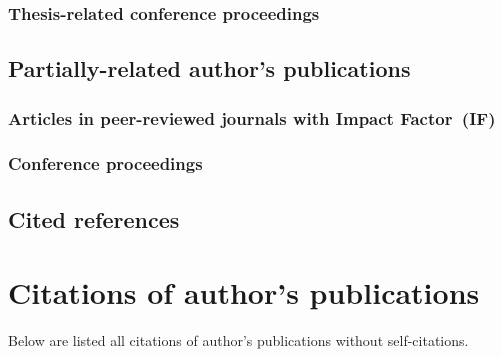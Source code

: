 \documentclass[a4paper,11pt,titlepage,twoside]{book}
\newcommand{\chapternoclear}[1]{
  \begingroup
  \let\cleardoublepage\clearpage
  \chapter{#1}
  \endgroup
}
\begin{document}

\subsection*{Thesis-related conference proceedings}
\printbibliography[keyword={mine},keyword={phd_related},keyword={conference},heading=none,title={}]

\section{Partially-related author's publications}

\subsection*{Articles in peer-reviewed journals with Impact Factor~(IF)}
\printbibliography[keyword={mine},keyword={phd_unrelated},keyword={journal},keyword={if},heading=none,title={}]

\subsection*{Conference proceedings}
\printbibliography[keyword={mine},keyword={phd_unrelated},keyword={conference},heading=none,title={}]

\section{Cited references}
\printbibliography[notkeyword=mine,heading=none,title={}]



\appendix
\renewcommand\chaptername{Citations of author's publications}

\chapternoclear{Citations of author's publications}

Below are listed all citations of author's publications without self-citations.

\DeclareCiteCommand{\fullcite}
{}
{%
  \usedriver
  {%
  }
{}}
{\multicitedelim}
{}
\end{document}
